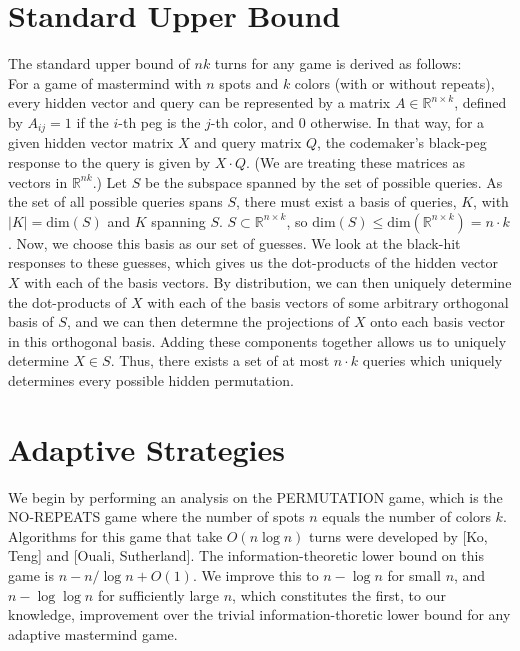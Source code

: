 \documentclass[12pt, a4paper]{article}
\begin{document}
\section{Standard Upper Bound}
The standard upper bound of $nk$ turns for any game is derived as follows: \\
For a game of mastermind with $n$ spots and $k$ colors (with or without repeats), every
hidden vector and query can be represented by a matrix $A\in\mathbb{R}^{n\times k}$,
defined by $A_{ij}=1$ if the $i$-th peg is the $j$-th color, and 0 otherwise.
In that way, for a given hidden vector matrix $X$ and query matrix $Q$,
the codemaker's black-peg response to the query is given by $X\cdot Q$.
(We are treating these matrices as vectors in $\mathbb R^{nk}$.)
Let $S$ be the subspace spanned by the set of possible queries. 
As the set of all possible queries spans $S$, there must exist a basis of queries,
$K$, with $|K|=\text{dim}(S)$ and $K$ spanning $S$. $S\subset \mathbb{R}^{n\times k}$,
so $\text{dim}(S)\le \text{dim}(\mathbb{R}^{n\times k})=n\cdot k$.
Now, we choose this basis as our set of guesses. We look at the black-hit responses to 
these guesses, which gives us the dot-products of the hidden vector $X$ with each of
the basis vectors. By distribution, we can then uniquely determine the dot-products of 
$X$ with each of the basis vectors of some arbitrary orthogonal basis of $S$, and we can
then determne the projections of $X$ onto each basis vector in this orthogonal basis.
Adding these components together allows us to uniquely determine $X \in S$. 
Thus, there exists a set of at most $n\cdot k$ queries which uniquely determines every
possible hidden permutation.
\section{Adaptive Strategies}
We begin by performing an analysis on the PERMUTATION game, which is the NO-REPEATS
game where the number of spots $n$ equals the number of colors $k$. Algorithms for this game
that take $O(n \log n)$ turns were developed by [Ko, Teng] and [Ouali, Sutherland]. The
information-theoretic lower bound on this game is $n - n/ \log n + O(1)$. We improve this to 
$n - \log n$ for small $n$, and $n- \log \log n$ for sufficiently large $n$, which constitutes
the first, to our knowledge, improvement over the trivial information-thoretic lower bound
for any adaptive mastermind game. \\
\end{document}
